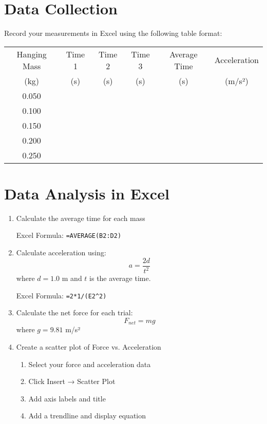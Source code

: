 \documentclass[12pt]{article}
\begin{document}
\section*{Data Collection}
Record your measurements in Excel using the following table format:

\begin{table}[H]
\centering
\begin{tabular}{cccccc}
\toprule
Hanging Mass & Time 1 & Time 2 & Time 3 & Average Time & Acceleration \\
(kg) & (s) & (s) & (s) & (s) & (m/s²) \\
\midrule
0.050 & & & & & \\
0.100 & & & & & \\
0.150 & & & & & \\
0.200 & & & & & \\
0.250 & & & & & \\
\bottomrule
\end{tabular}
\end{table}

\section*{Data Analysis in Excel}
\begin{enumerate}[label=\arabic*.]
\item Calculate the average time for each mass
\begin{tcolorbox}[colback=labblue!5,colframe=labblue]
Excel Formula: \texttt{=AVERAGE(B2:D2)}
\end{tcolorbox}

\item Calculate acceleration using:
$$a = \frac{2d}{t^2}$$
where $d = 1.0$ m and $t$ is the average time.
\begin{tcolorbox}[colback=labblue!5,colframe=labblue]
Excel Formula: \texttt{=2*1/(E2\^{}2)}
\end{tcolorbox}

\item Calculate the net force for each trial:
$$F_{net} = mg$$
where $g = 9.81$ m/s²

\item Create a scatter plot of Force vs. Acceleration
\begin{enumerate}[label=\alph*.]
\item Select your force and acceleration data
\item Click Insert → Scatter Plot
\item Add axis labels and title
\item Add a trendline and display equation
\end{enumerate}

\end{enumerate}
\end{document}
